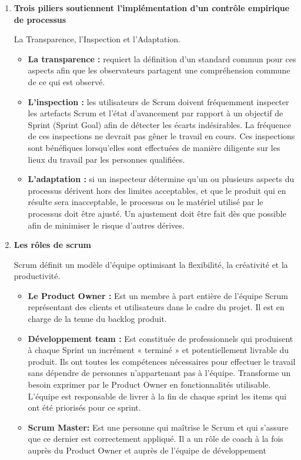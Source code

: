 \documentclass[11pt,a4paper]{article}
\begin{document}
\begin{enumerate}
\item \textbf{Trois piliers soutiennent l’implémentation d’un contrôle empirique de processus}

La Transparence, l’Inspection et l’Adaptation.
	\begin{itemize}
	\item \textbf{La transparence :} requiert la définition d’un standard commun pour ces aspects afin que les observateurs partagent une compréhension commune de ce qui est observé.
	\item \textbf{L’inspection :} les utilisateurs de Scrum doivent fréquemment inspecter les artefacts Scrum et l’état d’avancement par rapport à un objectif de Sprint (Sprint Goal) afin de détecter les écarts indésirables. La fréquence de ces inspections ne devrait pas gêner le travail en cours. Ces inspections sont bénéfiques lorsqu’elles sont effectuées de manière diligente sur les lieux du travail par les personnes qualifiées.
	\item \textbf{L’adaptation :} si un inspecteur détermine qu’un ou plusieurs aspects du processus dérivent hors des limites acceptables, et que le produit qui en résulte sera inacceptable, le processus ou le matériel utilisé par le processus doit être ajusté. Un ajustement doit être fait dès que possible afin de minimiser le risque d’autres dérives.
	\end{itemize}
	
\item \textbf{Les rôles de scrum}

	Scrum définit un modèle d’équipe optimisant la flexibilité, la créativité et la productivité.
	\begin{itemize}
	\item \textbf{Le Product Owner :} Est un membre à part entière de l’équipe Scrum représentant des clients et utilisateurs dans le cadre du projet. Il est en charge de la tenue du backlog produit.
	\item \textbf{Développement team :} Est constituée de professionnels qui produisent à chaque Sprint un incrément « terminé » et potentiellement livrable du produit. Ils ont toutes les compétences nécessaires pour effectuer le travail sans dépendre de personnes n’appartenant pas à l’équipe. Transforme un besoin exprimer par le Product Owner en fonctionnalités utilisable. L’équipe est responsable de livrer à la fin de chaque sprint les items qui ont été priorisés pour ce sprint.
	
	\item \textbf{Scrum Master:} Est une personne qui maîtrise le Scrum et qui s’assure que ce dernier est correctement appliqué. Il a un rôle de coach à la fois auprès du Product Owner et auprès de l’équipe de développement
	\end{itemize}


\end{enumerate}
\end{document}
